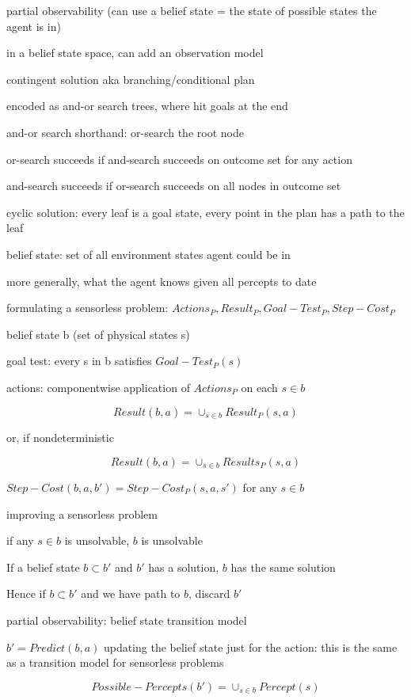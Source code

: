 \documentclass[12pt]{article}
\begin{document}
partial observability (can use a belief state = the state of possible states the agent is in)

in a belief state space, can add an observation model

\noindent
contingent solution aka branching/conditional plan

encoded as and-or search trees, where hit goals at the end

\noindent
and-or search shorthand: or-search the root node

or-search succeeds if and-search succeeds on outcome set for any action

and-search succeeds if or-search succeeds on all nodes in outcome set

\noindent
cyclic solution: every leaf is a goal state, every point in the plan has a path to the leaf

\noindent
belief state: set of all environment states agent could be in

more generally, what the agent knows given all percepts to date

\noindent
formulating a sensorless problem: $Actions_P, Result_P, Goal-Test_P, Step-Cost_P$

belief state b (set of physical states s)

goal test: every s in b satisfies $Goal-Test_P(s)$

actions: componentwise application of $Actions_P$ on each $s \in b$

$$Result(b,a) = \cup_{s \in b} Result_P(s, a)$$

or, if nondeterministic

$$Result(b,a) = \cup_{s \in b} Results_P(s, a)$$

$Step-Cost(b, a, b') = Step-Cost_P(s, a, s')$ for any $s \in b$

\noindent
improving a sensorless problem

if any $s \in b$ is unsolvable, $b$ is unsolvable

If a belief state $b \subset b'$ and $b'$ has a solution, $b$ has the same solution

Hence if $b \subset b'$ and we have path to $b$, discard $b'$

\noindent
partial observability: belief state transition model

$b' = Predict(b, a)$ updating the belief state just for the action: this is the same as a transition model for sensorless problems

$$Possible-Percepts(b') = \cup_{s \in b}Percept(s)$$
\end{document}
